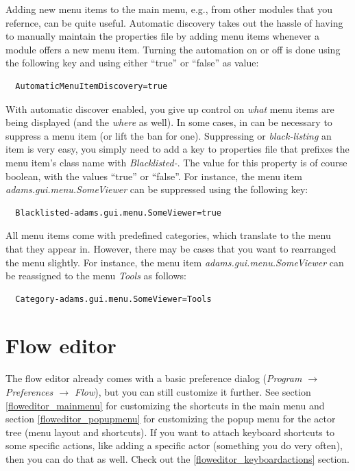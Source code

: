 Adding new menu items to the main menu, e.g., from other modules that you 
refernce, can be quite useful. Automatic discovery takes out the hassle of
having to manually maintain the properties file by adding menu items whenever 
a module offers a new menu item. Turning the automation on or off is done using
the following key and using either ``true'' or ``false'' as value:
\begin{verbatim}
  AutomaticMenuItemDiscovery=true
\end{verbatim}

With automatic discover enabled, you give up control on \textit{what} menu 
items are being displayed (and the \textit{where} as well). In some cases, 
in can be necessary to suppress a menu item (or lift the ban for one).
Suppressing or \textit{black-listing} an item is very easy, you simply need
to add a key to properties file that prefixes the menu item's class name 
with \textit{Blacklisted-}. The value for this property is of course boolean,
with the values ``true'' or ``false''. For instance, the menu item 
\textit{adams.gui.menu.SomeViewer} can be suppressed using the following key:
\begin{verbatim}
  Blacklisted-adams.gui.menu.SomeViewer=true
\end{verbatim}

All menu items come with predefined categories, which translate to the menu
that they appear in. However, there may be cases that you want to rearranged
the menu slightly. For instance, the menu item
\textit{adams.gui.menu.SomeViewer} can be reassigned to the menu \textit{Tools}
as follows:
\begin{verbatim}
  Category-adams.gui.menu.SomeViewer=Tools
\end{verbatim}

\section{Flow editor}
The flow editor already comes with a basic preference dialog (\textit{Program 
$\rightarrow$ Preferences $\rightarrow$ Flow}), but you can still customize it further.
See section \ref{floweditor_mainmenu} for customizing the shortcuts in the 
main menu and section \ref{floweditor_popupmenu} for customizing the popup
menu for the actor tree (menu layout and shortcuts). If you want to attach
keyboard shortcuts to some specific actions, like adding a specific actor
(something you do very often), then you can do that as well. Check out the
\ref{floweditor_keyboardactions} section.

